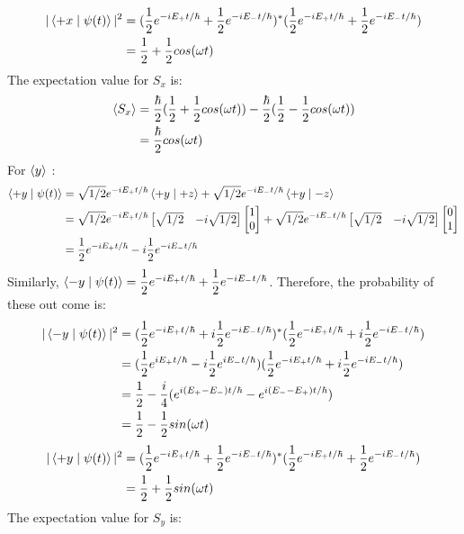 \documentclass{article}
\providecommand{\Matrix}[1] {\begin{bmatrix} #1 \end{bmatrix}}
\theoremstyle{definition}
\theoremstyle{plain}
\begin{document}
\begin {enumerate}[itemindent=30pt,label=\bf Exercise {\arabic*}:]
\begin{align*}
	|\Braket{+x \mid \psi(t)}|^{2} &= (\dfrac{1}{2} e^{-iE_{+}t/\hbar} + \dfrac{1}{2} e^{-iE_{-}t/\hbar})^{*}(\dfrac{1}{2} e^{-iE_{+}t/\hbar}+ \dfrac{1}{2} e^{-iE_{-}t/\hbar})\\
	&=\dfrac{1}{2} + \dfrac{1}{2} cos(\omega t)
\end{align*}
\subitem The expectation value for $S_{x}$ is:
\begin{align*}
	\Braket{S_{x}} &= \dfrac{\hbar}{2}(\dfrac{1}{2} + \dfrac{1}{2} cos(\omega t)) - \dfrac{\hbar}{2}(\dfrac{1}{2} - \dfrac{1}{2} cos(\omega t))\\
	&= \dfrac{\hbar}{2} cos(\omega t)
\end{align*}
\subitem For $\Braket{y}$ :
\begin{align*}
	\Braket{+y \mid \psi(t)} &= \sqrt{1/2} e^{-iE_{+}t/\hbar}\Braket{+y \mid +z} + \sqrt{1/2} e^{-iE_{-}t/\hbar}\Braket{+y \mid -z}\\
	&= \sqrt{1/2} e^{-iE_{+}t/\hbar}\Matrix{\sqrt{1/2} & -i\sqrt{1/2}} \Matrix{1 \\ 0}+ \sqrt{1/2} e^{-iE_{-}t/\hbar}\Matrix{\sqrt{1/2} & -i\sqrt{1/2}} \Matrix{0 \\ 1}\\
	&= \dfrac{1}{2} e^{-iE_{+}t/\hbar}-i\dfrac{1}{2} e^{-iE_{-}t/\hbar}
\end{align*}
\subitem Similarly, $\Braket{-y \mid \psi(t)} = \dfrac{1}{2} e^{-iE_{+}t/\hbar} + \dfrac{1}{2} e^{-iE_{-}t/\hbar}$. Therefore, the probability of these out come is:
\begin{align*}
	|\Braket{-y \mid \psi(t)}|^{2} &= (\dfrac{1}{2} e^{-iE_{+}t/\hbar} + i\dfrac{1}{2} e^{-iE_{-}t/\hbar})^{*}(\dfrac{1}{2} e^{-iE_{+}t/\hbar} + i\dfrac{1}{2} e^{-iE_{-}t/\hbar})\\ 
	&=(\dfrac{1}{2} e^{iE_{+}t/\hbar} - i\dfrac{1}{2} e^{iE_{-}t/\hbar})(\dfrac{1}{2} e^{-iE_{+}t/\hbar} +  i\dfrac{1}{2} e^{-iE_{-}t/\hbar})\\ 
	&= \dfrac{1}{2} - \dfrac{i}{4}( e^{i(E_{+} - E_{-})t/\hbar} - e^{i(E_{-} - E_{+})t/\hbar})\\
	&= \dfrac{1}{2} - \dfrac{1}{2} sin(\omega t)
\end{align*}
\begin{align*}
	|\Braket{+y \mid \psi(t)}|^{2} &=(\dfrac{1}{2} e^{-iE_{+}t/\hbar} + \dfrac{1}{2} e^{-iE_{-}t/\hbar})^{*}(\dfrac{1}{2} e^{-iE_{+}t/\hbar} + \dfrac{1}{2} e^{-iE_{-}t/\hbar})\\
	&=\dfrac{1}{2} + \dfrac{1}{2} sin(\omega t)
\end{align*}
\subitem The expectation value for $S_{y}$ is:

\end{enumerate}
\end{document}
